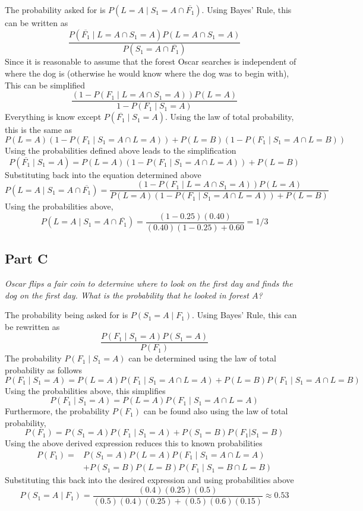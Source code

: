 \documentclass{article}
\begin{document}
The probability asked for is $ P(L = A \mid S_1 = A \cap \overline{F_1}) $.
Using Bayes' Rule, this can be written as
$$ \frac{ P(\overline{F_1} \mid L = A \cap S_1 = A) P(L = A \cap S_1 = A) }{
    P(S_1 = A \cap \overline{F_1}) } $$
Since it is reasonable to assume that the forest Oscar searches is independent
of where the dog is (otherwise he would know where the dog was to begin with),
This can be simplified
$$ \frac{ (1 - P(F_1 \mid L = A \cap S_1 = A)) P(L = A) }{ 1 - P(F_1 \mid S_1 =
A) } $$
Everything is know except $ P(\overline{F_1} \mid S_1 = A) $. Using the law of
total probability, this is the same as
$$ P(L = A) (1 - P(F_1 \mid S_1 = A \cap L = A)) + P(L = B) (1 - P(F_1 \mid S_1
= A \cap L = B)) $$
Using the probabilities defined above leads to the simplification
$$ P(\overline{F_1} \mid S_1 = A) = P(L = A) (1 - P(F_1 \mid S_1 = A \cap L =
A)) + P(L = B) $$
Substituting back into the equation determined above
$$ P(L = A \mid S_1 = A \cap \overline{F_1}) = \frac{ (1 - P(F_1 \mid L =
A \cap S_1 = A)) P(L = A) }{ P(L = A) (1 - P(F_1 \mid S_1 = A \cap L = A)) + P(L
= B) } $$
Using the probabilities above,
$$ P(L = A \mid S_1 = A \cap \overline{F_1}) = \frac{ (1 - 0.25) (0.40) }{
    (0.40) (1 - 0.25) + 0.60 } = 1/3 $$

\subsection*{Part C}

\textit{Oscar flips a fair coin to determine where to look on the first day and
finds the dog on the first day. What is the probability that he looked in forest
$ A $?}

\bigbreak

The probability being asked for is $ P(S_1 = A \mid F_1) $. Using Bayes' Rule,
this can be rewritten as
$$ \frac{ P(F_1 \mid S_1 = A) P(S_1 = A) }{ P(F_1) } $$
The probability $ P(F_1 \mid S_1 = A) $ can be determined using the law of total
probability as follows
$$ P(F_1 \mid S_1 = A) = P(L = A) P(F_1 \mid S_1 = A \cap L = A) + P(L = B)
P(F_1 \mid S_1 = A \cap L = B) $$
Using the probabilities above, this simplifies
$$ P(F_1 \mid S_1 = A) = P(L = A) P(F_1 \mid S_1 = A \cap L = A) $$
Furthermore, the probability $ P(F_1) $ can be found also using the law of total
probability,
$$ P(F_1) = P(S_1 = A) P(F_1 \mid S_1 = A) + P(S_1 = B) P(F_1 | S_1 = B) $$
Using the above derived expression reduces this to known probabilities
\begin{align*}
    P(F_1) = &P(S_1 = A) P(L = A) P(F_1 \mid S_1 = A \cap L = A) \\
    &+ P(S_1 = B) P(L = B) P(F_1 \mid S_1 = B \cap L = B)
\end{align*}
Substituting this back into the desired expression and using probabilities above
$$ P(S_1 = A \mid F_1) = \frac{ (0.4) (0.25) (0.5) }{ (0.5)(0.4)(0.25) +
(0.5)(0.6)(0.15) } \approx 0.53 $$
\end{document}

